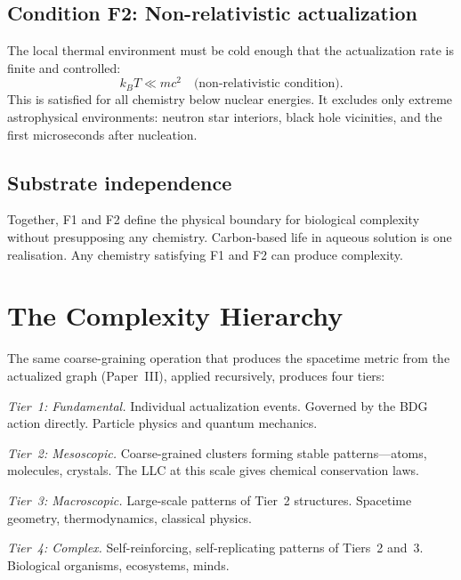 \documentclass[11pt,a4paper]{article}
\theoremstyle{plain}
\theoremstyle{definition}
\theoremstyle{remark}
\begin{document}
\subsection{Condition F2: Non-relativistic actualization}\label{sec:f2}

The local thermal environment must be cold enough that the actualization rate is
finite and controlled:
\begin{equation}
k_B T \ll mc^2 \quad\text{(non-relativistic condition).}
\label{eq:f2}
\end{equation}
This is satisfied for all chemistry below nuclear energies.  It excludes only
extreme astrophysical environments: neutron star interiors, black hole vicinities,
and the first microseconds after nucleation.

\subsection{Substrate independence}\label{sec:substrate}

Together, F1 and F2 define the physical boundary for biological complexity without
presupposing any chemistry.  Carbon-based life in aqueous solution is one
realisation.  Any chemistry satisfying F1 and F2 can produce complexity.

\section{The Complexity Hierarchy}\label{sec:hierarchy}

The same coarse-graining operation that produces the spacetime metric from the
actualized graph (Paper~III), applied recursively, produces four tiers:

\emph{Tier~1: Fundamental.}  Individual actualization events.  Governed by the BDG
action directly.  Particle physics and quantum mechanics.

\emph{Tier~2: Mesoscopic.}  Coarse-grained clusters forming stable
patterns---atoms, molecules, crystals.  The LLC at this scale gives chemical
conservation laws.

\emph{Tier~3: Macroscopic.}  Large-scale patterns of Tier~2 structures.  Spacetime
geometry, thermodynamics, classical physics.

\emph{Tier~4: Complex.}  Self-reinforcing, self-replicating patterns of Tiers~2
and~3.  Biological organisms, ecosystems, minds.
\end{document}
